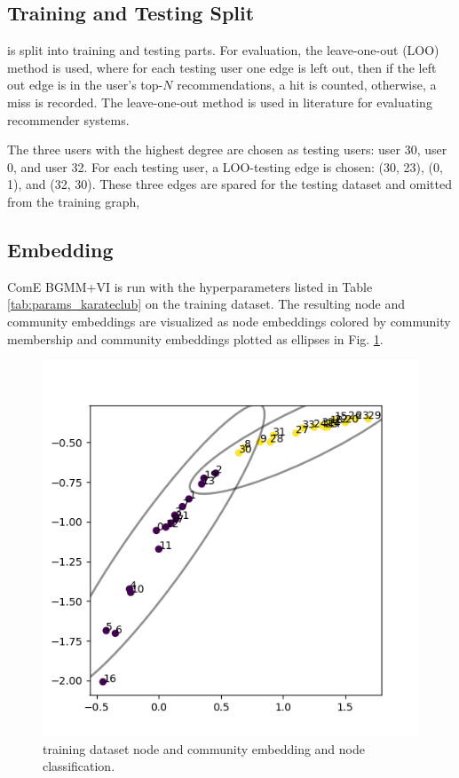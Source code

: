 \documentclass[conference]{IEEEtran}
\begin{document}
\subsection{Training and Testing Split}

 is split into training and testing parts. For evaluation, the leave-one-out (LOO) method is used, where for each testing user one edge is left out, then if the left out edge is in the user's top-$N$ recommendations, a hit is counted, otherwise, a miss is recorded. The leave-one-out method is used in literature for evaluating recommender systems.\cite{Zhao2019ATS, He2017NeuralCF}

The three users with the highest degree are chosen as testing users: user 30, user 0, and user 32. For each testing user, a LOO-testing edge is chosen: (30, 23), (0, 1), and (32, 30). These three edges are spared for the testing dataset and omitted from the training graph,

\subsection{Embedding}

ComE BGMM+VI is run with the hyperparameters listed in Table \ref{tab:params_karateclub} on the training dataset. The resulting node and community embeddings are visualized as node embeddings colored by community membership and community embeddings plotted as ellipses in Fig. \ref{fig:karateclub_emb}.

\begin{figure}
    \centering
    \includegraphics[width=1\linewidth]{images/karateclub/embeddings_5.png}
    \caption{ training dataset node and community embedding and node classification.}
    \label{fig:karateclub_emb}
\end{figure}
\end{document}
